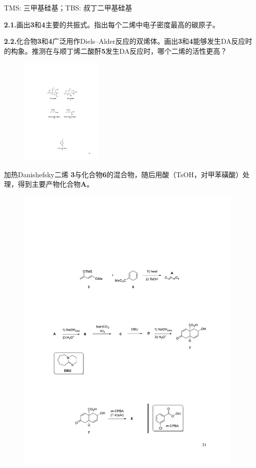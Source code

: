 TMS: 三甲基硅基；TBS: 叔丁二甲基硅基

\noindent\textbf{2.1.}画出\textbf{3}和\textbf{4}主要的共振式。指出每个二烯中电子密度最高的碳原子。

\noindent\textbf{2.2.}化合物\textbf{3}和\textbf{4}广泛用作Diels--Alder反应的双烯体。画出\textbf{3}和\textbf{4}能够发生DA反应时的构象。推测在与顺丁烯二酸酐\textbf{5}发生DA反应时，哪个二烯的活性更高？

\begin{figure}[h]
	\centering
	\includegraphics[width=4cm]{./pic/t2-5.pdf}
\end{figure}

加热Danishefsky二烯 \textbf{3}与化合物\textbf{6}的混合物，随后用酸（TsOH，对甲苯磺酸）处理，得到主要产物化合物\textbf{A}。

\begin{figure}[h!]
	\centering
	\includegraphics[width=11cm]{./pic/t2-6.pdf}
\end{figure}

